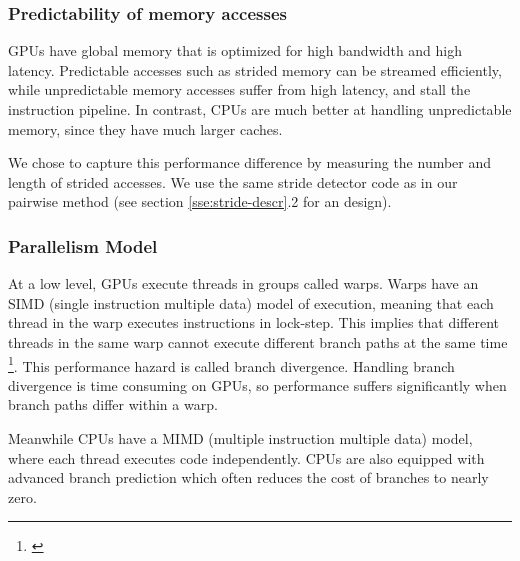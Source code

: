 \documentclass[12pt,twoside]{reedthesis}
\begin{document}
		
		
		
		\subsubsection{Predictability of memory accesses}
		
		
		GPUs have global memory that is optimized for high bandwidth and high latency. Predictable accesses such as strided memory can be streamed efficiently, while unpredictable memory accesses suffer from high latency, and stall the instruction pipeline. 
		In contrast, CPUs are much better at handling unpredictable memory, since they have much larger caches. %
		
		We chose to capture this performance difference by measuring the number and length of strided accesses. 
		We use the same stride detector code as in our pairwise method (see section \ref{sse:stride-descr}.2 for an design). 
		
		
		\subsubsection{Parallelism Model}
		
		At a low level, GPUs execute threads in groups called warps. Warps have an SIMD (single instruction multiple data) model of execution, meaning that each thread in the warp executes instructions in lock-step. This implies that different threads in the same warp cannot execute different branch paths at the same time \footnote{\cite{Fung:2007:DWF:1331699.1331735}}. This performance hazard is called  branch divergence. Handling branch divergence is time consuming on GPUs, so performance suffers significantly when branch paths differ within a warp.
		
		Meanwhile CPUs have a MIMD (multiple instruction multiple data) model, where each thread executes code independently. CPUs are also equipped with advanced branch prediction which often reduces the cost of branches to nearly zero. 
		
\end{document}
